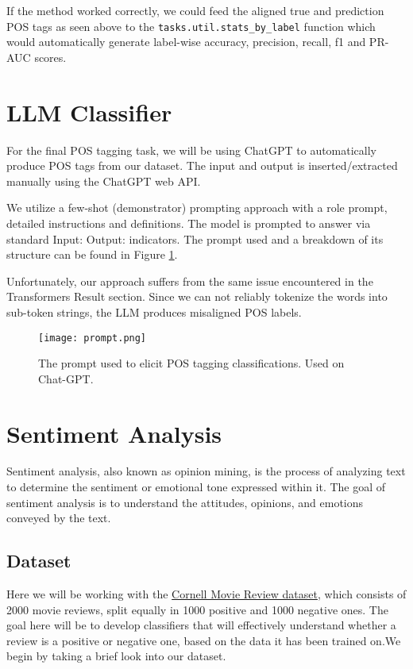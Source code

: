 \documentclass[10pt, a4paper]{article}
\def\code#1{\texttt{#1}}
\begin{document}
	If the method worked correctly, we could feed the aligned true and prediction POS tags as seen above to the \code{tasks.util.stats\_by\_label} function which would automatically generate label-wise accuracy, precision, recall, f1 and PR-AUC scores.
	
	
	\section{LLM Classifier}
	
	For the final POS tagging task, we will be using ChatGPT to automatically produce POS tags from our dataset. The input and output is inserted/extracted manually using the ChatGPT web API.
	
	We utilize a few-shot (demonstrator) prompting approach with a role prompt, detailed instructions and definitions. The model is prompted to answer via standard Input: Output: indicators. The prompt used and a breakdown of its structure can be found in Figure \ref{fig::prompt.png}.
	
	Unfortunately, our approach suffers from the same issue encountered in the Transformers Result section. Since we can not reliably tokenize the words into sub-token strings, the LLM produces misaligned POS labels.
	
	\begin{figure}
		\centering
		\texttt{[image: prompt.png]}
		\caption{The prompt used to elicit POS tagging classifications. Used on Chat-GPT.}
		\label{fig::prompt.png}
	\end{figure}
	
		
	
	
	
	
	
	
	
	\section{Sentiment Analysis}
	
	Sentiment analysis, also known as opinion mining, is the process of analyzing text to determine the sentiment or emotional tone expressed within it. The goal of sentiment analysis is to understand the attitudes, opinions, and emotions conveyed by the text. 
	
	
	\subsection{Dataset}
	Here we will be working with the \href{http://www.cs.cornell.edu/people/pabo/movie-review-data/}{Cornell Movie Review dataset}, which consists of 2000 movie reviews, split equally in 1000 positive and 1000 negative ones. The goal here will be to develop classifiers that will effectively understand whether a review is a positive or negative one, based on the data it has been trained on.We begin by taking a brief look into our dataset.
	
\end{document}
